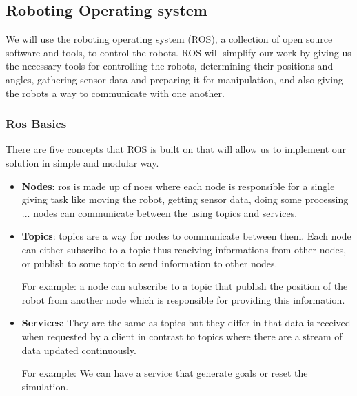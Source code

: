 \documentclass[12pt]{article}
\begin{document}
\subsection{Roboting Operating system}

We will use the roboting operating system (ROS), a collection of open source software and tools, to control the robots.
ROS will simplify our work by giving us the necessary tools for controlling the robots, determining their positions and angles, gathering sensor data and preparing it for manipulation, and also giving the robots a way to communicate with one another.

\subsubsection{Ros Basics}
There are five concepts that ROS is built on that will allow us to implement our solution in  simple and modular way.


 

\begin{itemize}
\item \textbf{Nodes}: ros is made up of noes where  each node     is responsible for a single giving task like moving the robot, getting sensor data, doing some processing ... \linebreak
nodes can communicate between the using topics and services.
     



\item \textbf{Topics}: topics are a way for nodes to communicate between them. Each node can either subscribe to a topic thus reaciving informations from other nodes, or publish to some topic to send information to other nodes.

For example: a node can subscribe to a topic that publish the position of the robot  from another node which is responsible for providing this information.


\item \textbf{Services}:  They are the same as topics but they differ in that data is received when requested by a client in contrast to topics where there are a stream of data updated continuously.


For example: We can have a service that generate goals or reset the simulation.



\end{itemize}
 
\end{document}
